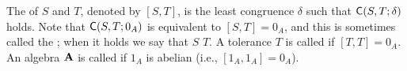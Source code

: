 The  of $S$ and $T$, denoted by $[S, T]$,
is the least congruence $\delta$ such that $\mathsf{C}(S, T; \delta)$ 
holds.  
Note that $\mathsf{C}(S, T; 0_A)$ is equivalent to $[S,T] = 0_A$, and this
is sometimes called the ;
when it holds we say  that
$S$  $T$. %
A tolerance $T$ is called  if
$[T, T] = 0_A$.  
An algebra $\mathbf{A}$ is called  if $1_A$ is abelian
(i.e., $[1_A,1_A] = 0_A$).




